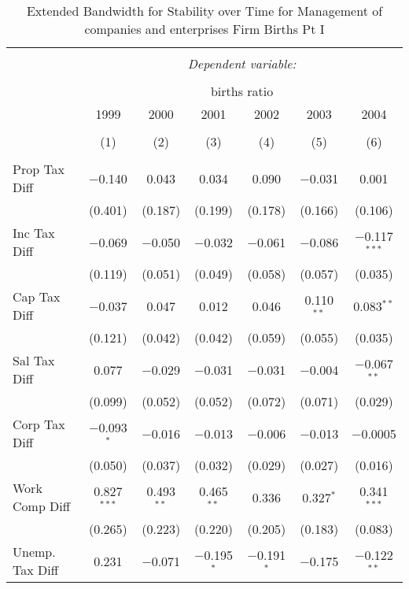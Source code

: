 
\begin{table}[!htbp] \centering 
  \caption{Extended Bandwidth for Stability over Time for  Management of companies and enterprises Firm Births Pt I} 
  \label{55year_eb} 
\small 
\begin{tabular}{@{\extracolsep{5pt}}lcccccc} 
\\[-1.8ex]\hline 
\hline \\[-1.8ex] 
 & \multicolumn{6}{c}{\textit{Dependent variable:}} \\ 
\cline{2-7} 
\\[-1.8ex] & \multicolumn{6}{c}{births ratio} \\ 
 & 1999 & 2000 & 2001 & 2002 & 2003 & 2004 \\ 
\\[-1.8ex] & (1) & (2) & (3) & (4) & (5) & (6)\\ 
\hline \\[-1.8ex] 
 Prop Tax Diff & $-$0.140 & 0.043 & 0.034 & 0.090 & $-$0.031 & 0.001 \\ 
  & (0.401) & (0.187) & (0.199) & (0.178) & (0.166) & (0.106) \\ 
  Inc Tax Diff & $-$0.069 & $-$0.050 & $-$0.032 & $-$0.061 & $-$0.086 & $-$0.117$^{***}$ \\ 
  & (0.119) & (0.051) & (0.049) & (0.058) & (0.057) & (0.035) \\ 
  Cap Tax Diff & $-$0.037 & 0.047 & 0.012 & 0.046 & 0.110$^{**}$ & 0.083$^{**}$ \\ 
  & (0.121) & (0.042) & (0.042) & (0.059) & (0.055) & (0.035) \\ 
  Sal Tax Diff & 0.077 & $-$0.029 & $-$0.031 & $-$0.031 & $-$0.004 & $-$0.067$^{**}$ \\ 
  & (0.099) & (0.052) & (0.052) & (0.072) & (0.071) & (0.029) \\ 
  Corp Tax Diff & $-$0.093$^{*}$ & $-$0.016 & $-$0.013 & $-$0.006 & $-$0.013 & $-$0.0005 \\ 
  & (0.050) & (0.037) & (0.032) & (0.029) & (0.027) & (0.016) \\ 
  Work Comp Diff & 0.827$^{***}$ & 0.493$^{**}$ & 0.465$^{**}$ & 0.336 & 0.327$^{*}$ & 0.341$^{***}$ \\ 
  & (0.265) & (0.223) & (0.220) & (0.205) & (0.183) & (0.083) \\ 
  Unemp. Tax Diff & 0.231 & $-$0.071 & $-$0.195$^{*}$ & $-$0.191$^{*}$ & $-$0.175 & $-$0.122$^{**}$ \\ 

\end{tabular}
\end{table}
